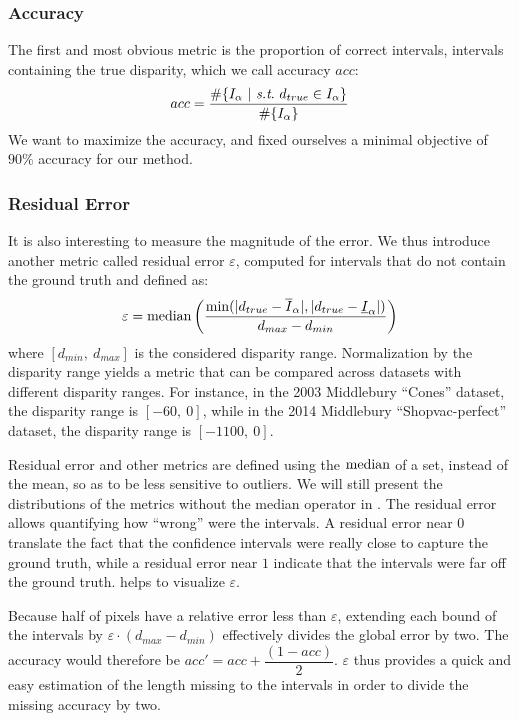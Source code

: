 \subsubsection{Accuracy}
The first and most obvious metric is the proportion of correct intervals, \ie intervals containing the true disparity, which we call accuracy $acc$:
\begin{align}
    acc = \dfrac{\#\{I_\alpha ~|~ \st ~d_{true}\in I_\alpha\}}{\#\{I_\alpha\}}\label{eq:accuracy}
\end{align}
We want to maximize the accuracy, and fixed ourselves a minimal objective of $90\%$ accuracy for our method.

\subsubsection{Residual Error}
It is also interesting to measure the magnitude of the error. We thus introduce another metric called residual error $\varepsilon$, computed for intervals that do not contain the ground truth and defined as:
\begin{align}
    \varepsilon=\operatorname*{median} \left( \dfrac{\min(|d_{true}-\overline{I}_\alpha|, |d_{true}-\underline{I}_\alpha|)}{d_{max}-d_{min}}\right)\label{eq:residual_error}
\end{align}
where $[d_{min}, ~d_{max}]$ is the considered disparity range. Normalization by the disparity range yields a metric that can be compared across datasets with different disparity ranges. For instance, in the 2003 Middlebury ``Cones'' dataset, the disparity range is $[-60, ~0]$, while in the 2014 Middlebury ``Shopvac-perfect'' dataset, the disparity range is $[-1100, ~0]$.

Residual error and other metrics are defined using the $\operatorname*{median}$ of a set, instead of the mean, so as to be less sensitive to outliers. We will still present the distributions of the metrics without the median operator in . The residual error allows quantifying how ``wrong'' were the intervals. A residual error near $0$ translate the fact that the confidence intervals were really close to capture the ground truth, while a residual error near $1$ indicate that the intervals were far off the ground truth.  helps to visualize $\varepsilon$.

Because half of pixels have a relative error less than $\varepsilon$, extending each bound of the intervals by $\varepsilon\cdot(d_{max}-d_{min})$ effectively divides the global error by two. The accuracy would therefore be $acc'=acc+\dfrac{(1-acc)}{2}$. $\varepsilon$ thus provides a quick and easy estimation of the length missing to the intervals in order to divide the missing accuracy by two.

